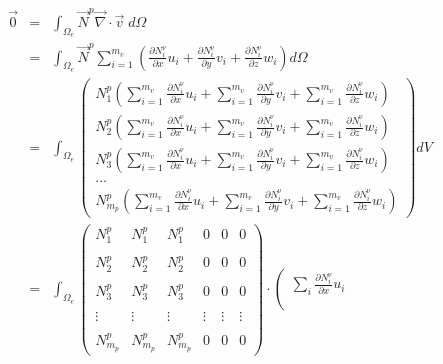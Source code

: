 \begin{eqnarray}
\vec 0&=&\int_{\Omega_e} \vec{N}^p {\vec \nabla}\cdot {\vec v} \; d\Omega \nonumber\\
&=& \int_{\Omega_e} \vec{N}^p \sum_{i=1}^{m_v} 
\left( \frac{\partial N_i^\upnu}{\partial x} u_i + \frac{\partial N_i^\upnu}{\partial y} v_i 
+ \frac{\partial N_i^\upnu}{\partial z} w_i 
\right)  
d\Omega \nonumber\\
&=& 
\int_{\Omega_e} 
\left(
\begin{array}{c}
N_1^p \left(
\sum\limits_{i=1}^{m_v} \frac{\partial N_i^\upnu}{\partial x} u_i +
\sum\limits_{i=1}^{m_v} \frac{\partial N_i^\upnu}{\partial y} v_i +
\sum\limits_{i=1}^{m_v} \frac{\partial N_i^\upnu}{\partial z} w_i  \right) \\
N_2^p \left(
\sum\limits_{i=1}^{m_v} \frac{\partial N_i^\upnu}{\partial x} u_i +
\sum\limits_{i=1}^{m_v} \frac{\partial N_i^\upnu}{\partial y} v_i +
\sum\limits_{i=1}^{m_v} \frac{\partial N_i^\upnu}{\partial z} w_i  \right) \\
N_3^p \left(
\sum\limits_{i=1}^{m_v} \frac{\partial N_i^\upnu}{\partial x} u_i +
\sum\limits_{i=1}^{m_v} \frac{\partial N_i^\upnu}{\partial y} v_i +
\sum\limits_{i=1}^{m_v} \frac{\partial N_i^\upnu}{\partial z} w_i  \right) \\
\dots \\
N_{m_p}^p \left(
\sum\limits_{i=1}^{m_v} \frac{\partial N_i^\upnu}{\partial x} u_i +
\sum\limits_{i=1}^{m_v} \frac{\partial N_i^\upnu}{\partial y} v_i +
\sum\limits_{i=1}^{m_v} \frac{\partial N_i^\upnu}{\partial z} w_i  \right) 
\end{array}
\right) dV \nonumber \\  %
&=& 
\int_{\Omega_e} 
\left(
\begin{array}{cccccc}
{N}_1^p & {N}_1^p & {N}_1^p & 0 & 0 & 0 \\\\
{N}_2^p & {N}_2^p & {N}_2^p & 0 & 0 & 0 \\\\
{N}_3^p & {N}_3^p & {N}_3^p & 0 & 0 & 0 \\\\
\vdots & \vdots & \vdots & \vdots & \vdots & \vdots \\\\
{N}_{m_p}^p & {N}_{m_p}^p & {N}_{m_p}^p & 0 &0 & 0 
\end{array}
\right)
\cdot
\left(
\begin{array}{c}
\sum\limits_i \frac{\partial N_i^\upnu}{\partial x} u_i \\ \\

\end{array}
\end{eqnarray}
